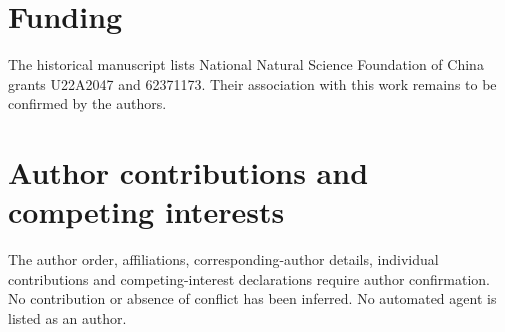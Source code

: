 \documentclass[12pt,a4paper]{article}
\begin{document}
\section*{Funding}
The historical manuscript lists National Natural Science Foundation of China grants U22A2047 and 62371173. Their association with this work remains to be confirmed by the authors.
\section*{Author contributions and competing interests}
The author order, affiliations, corresponding-author details, individual contributions and competing-interest declarations require author confirmation. No contribution or absence of conflict has been inferred. No automated agent is listed as an author.



\end{document}
